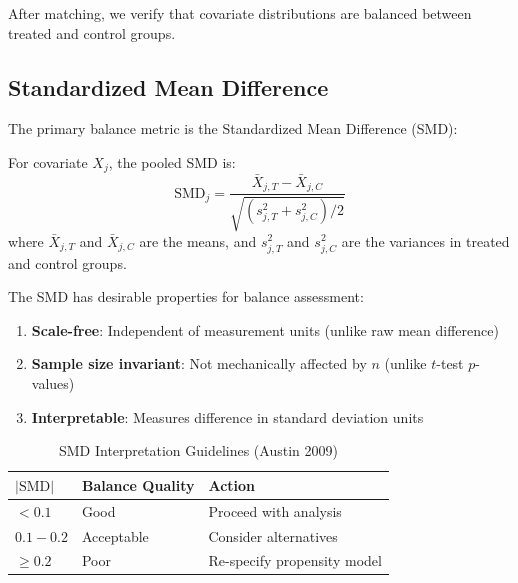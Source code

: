 After matching, we verify that covariate distributions are balanced between treated and control groups.

\subsection{Standardized Mean Difference}

The primary balance metric is the Standardized Mean Difference (SMD):

\begin{definition}
\label{def:smd}
For covariate $X_j$, the pooled SMD is:
\begin{equation}
\text{SMD}_j = \frac{\bar{X}_{j,T} - \bar{X}_{j,C}}{\sqrt{(s_{j,T}^2 + s_{j,C}^2)/2}}
\label{eq:smd}
\end{equation}
where $\bar{X}_{j,T}$ and $\bar{X}_{j,C}$ are the means, and $s_{j,T}^2$ and $s_{j,C}^2$ are the variances in treated and control groups.
\end{definition}

\begin{proposition}
\label{prop:smd_properties}
The SMD has desirable properties for balance assessment:
\begin{enumerate}
    \item \textbf{Scale-free}: Independent of measurement units (unlike raw mean difference)
    \item \textbf{Sample size invariant}: Not mechanically affected by $n$ (unlike $t$-test $p$-values)
    \item \textbf{Interpretable}: Measures difference in standard deviation units
\end{enumerate}
\end{proposition}

\begin{table}[ht]
\centering
\caption{SMD Interpretation Guidelines (Austin 2009)}
\label{tab:smd_thresholds}
\begin{tabular}{lll}
\toprule
\textbf{$|\text{SMD}|$} & \textbf{Balance Quality} & \textbf{Action} \\
\midrule
$< 0.1$ & Good & Proceed with analysis \\
$0.1 - 0.2$ & Acceptable & Consider alternatives \\
$\geq 0.2$ & Poor & Re-specify propensity model \\
\bottomrule
\end{tabular}
\end{table}


